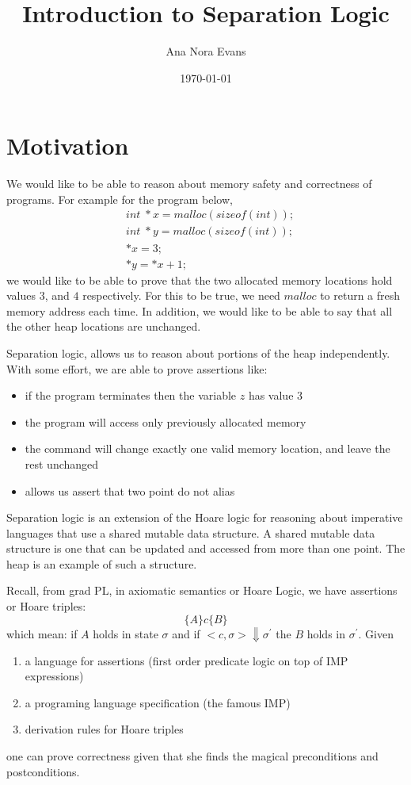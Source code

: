 \documentclass[12pt]{article}
\begin{document}
\title{Introduction to Separation Logic}
\author{Ana Nora Evans}
\date{\today}
\maketitle
\thispagestyle{empty}

\section{Motivation}

We would like to be able to reason about memory safety and correctness of programs. For example for the program below,
\begin{align*}
&int \; *x = malloc (sizeof(int));\\
&int \; *y = malloc (sizeof(int));\\
&*x = 3;\\
&*y = *x + 1;
\end{align*}
we would like to be able to prove that the two allocated memory locations hold values $3$, and $4$ respectively. For this to be true, we need $malloc$ to return a fresh memory address each time. In addition, we would like to be able to say that all the other heap locations are unchanged.

Separation logic, allows us to reason about portions of the heap independently. With some effort, we are able to prove assertions like: 
\begin{itemize}
\item if the program terminates then the variable $z$ has value $3$
\item the program will access only previously allocated memory
\item the command will change exactly one valid memory location, and leave the rest unchanged
\item allows us assert that two point do not alias 
\end{itemize}

Separation logic is an extension of the Hoare logic for reasoning about imperative languages that use a shared mutable data structure. A shared mutable data structure is one that can be updated and accessed from more than one point. The heap is an example of such a structure. 

Recall, from grad PL, in axiomatic semantics or Hoare Logic, we have assertions or Hoare triples:
\begin{equation*}
\{A\}c\{B\}
\end{equation*}
which mean: if $A$ holds in state $\sigma$ and if $<c,\sigma>\Downarrow\sigma^\prime$ the $B$ holds in $\sigma^\prime$. Given
\begin{enumerate}
\item a language for assertions (first order predicate logic on top of IMP expressions)
\item a programing language specification (the famous IMP)
\item derivation rules for Hoare triples 
\end{enumerate}
one can prove correctness given that she finds the magical preconditions and postconditions.
\end{document}
